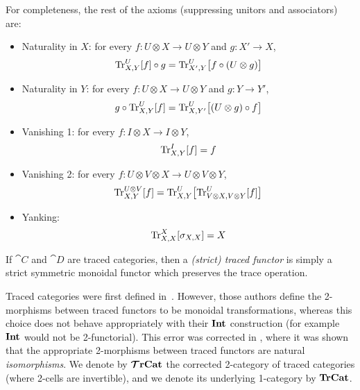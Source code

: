 \documentclass[11pt,oneside,article]{memoir}
\begin{document}
For completeness, the rest of the axioms (suppressing unitors and associators) are:
\begin{itemize}
   \item Naturality in $X$: for every $f\colon U\otimes X\to U\otimes Y$ and $g\colon X'\to X$,
      \begin{equation*}
         \operatorname{Tr}^U_{X,Y}[f]\circ g = \operatorname{Tr}^U_{X',Y}\bigl[f\circ(U\otimes g)\bigr]
      \end{equation*}
   \item Naturality in $Y$: for every $f\colon U\otimes X\to U\otimes Y$ and $g\colon Y\to Y'$,
      \begin{equation*}
         g\circ\operatorname{Tr}^U_{X,Y}[f] = \operatorname{Tr}^U_{X,Y'}\bigl[(U\otimes g)\circ f\bigr]
      \end{equation*}
   \item Vanishing 1: for every $f\colon I\otimes X\to I\otimes Y$,
      \begin{equation*}
         \operatorname{Tr}^I_{X,Y}[f] = f
      \end{equation*}
   \item Vanishing 2: for every $f\colon U\otimes V\otimes X\to U\otimes V\otimes Y$,
      \begin{equation*}
         \operatorname{Tr}^{U\otimes V}_{X,Y}[f] = \operatorname{Tr}^U_{X,Y}\bigl[\operatorname{Tr}^U_{V\otimes X,V\otimes Y}[f]\bigr]
      \end{equation*}
   \item Yanking:
      \begin{equation*}
         \operatorname{Tr}^X_{X,X}[\sigma_{X,X}]=X
      \end{equation*}
\end{itemize}

If $\cat{C}$ and $\cat{D}$ are traced categories, then a \emph{(strict) traced functor} is simply a
strict symmetric monoidal functor which preserves the trace operation.

\begin{remark}\label{rem:traced_2morphisms}
Traced categories were first defined in~\cite{JoyalStreetVerity}. However, those authors define the
2-morphisms between traced functors to be monoidal transformations, whereas this choice does not
behave appropriately with their $\mathbf{Int}$ construction (for example $\mathbf{Int}$ would not be 2-functorial).
This error was corrected in \cite{HK}, where it was shown that the appropriate 2-morphisms between
traced functors are natural \emph{isomorphisms}. We denote by $\bm{\mathcal{T}}\mathbf{rCat}$ the corrected 2-category of
traced categories (where 2-cells are invertible), and we denote its underlying 1-category by
$\mathbf{TrCat}$.
\end{remark}
\end{document}
